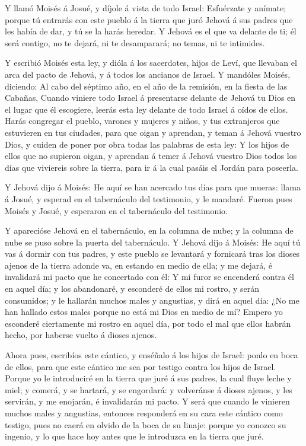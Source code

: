  Y llamó Moisés á Josué, y díjole á vista de todo Israel:
Esfuérzate y anímate; porque tú entrarás con este pueblo á la tierra que
juró Jehová á sus padres que les había de dar, y tú se la harás heredar.
 Y Jehová es el que va delante de ti; él será contigo, no te
dejará, ni te desamparará; no temas, ni te intimides.

 Y escribió Moisés esta ley, y dióla á los sacerdotes, hijos
de Leví, que llevaban el arca del pacto de Jehová, y á todos los
ancianos de Israel.  Y mandóles Moisés, diciendo: Al cabo
del séptimo año, en el año de la remisión, en la fiesta de las Cabañas,
 Cuando viniere todo Israel á presentarse delante de Jehová
tu Dios en el lugar que él escogiere, leerás esta ley delante de todo
Israel á oídos de ellos.  Harás congregar el pueblo,
varones y mujeres y niños, y tus extranjeros que estuvieren en tus
ciudades, para que oigan y aprendan, y teman á Jehová vuestro Dios, y
cuiden de poner por obra todas las palabras de esta ley:  Y
los hijos de ellos que no supieron oigan, y aprendan á temer á Jehová
vuestro Dios todos los días que viviereis sobre la tierra, para ir á la
cual pasáis el Jordán para poseerla.

 Y Jehová dijo á Moisés: He aquí se han acercado tus días
para que mueras: llama á Josué, y esperad en el tabernáculo del
testimonio, y le mandaré. Fueron pues Moisés y Josué, y esperaron en el
tabernáculo del testimonio.

 Y aparecióse Jehová en el tabernáculo, en la columna de
nube; y la columna de nube se puso sobre la puerta del tabernáculo.
 Y Jehová dijo á Moisés: He aquí tú vas á dormir con tus
padres, y este pueblo se levantará y fornicará tras los dioses ajenos de
la tierra adonde va, en estando en medio de ella; y me dejará, é
invalidará mi pacto que he concertado con él:  Y mi furor
se encenderá contra él en aquel día; y los abandonaré, y esconderé de
ellos mi rostro, y serán consumidos; y le hallarán muchos males y
angustias, y dirá en aquel día: ¿No me han hallado estos males porque no
está mi Dios en medio de mí?  Empero yo esconderé
ciertamente mi rostro en aquel día, por todo el mal que ellos habrán
hecho, por haberse vuelto á dioses ajenos.

 Ahora pues, escribíos este cántico, y enséñalo á los hijos
de Israel: ponlo en boca de ellos, para que este cántico me sea por
testigo contra los hijos de Israel.  Porque yo le
introduciré en la tierra que juré á sus padres, la cual fluye leche y
miel; y comerá, y se hartará, y se engordará: y volveránse á dioses
ajenos, y les servirán, y me enojarán, é invalidarán mi pacto.
 Y será que cuando le vinieren muchos males y angustias,
entonces responderá en su cara este cántico como testigo, pues no caerá
en olvido de la boca de su linaje: porque yo conozco su ingenio, y lo
que hace hoy antes que le introduzca en la tierra que juré.

